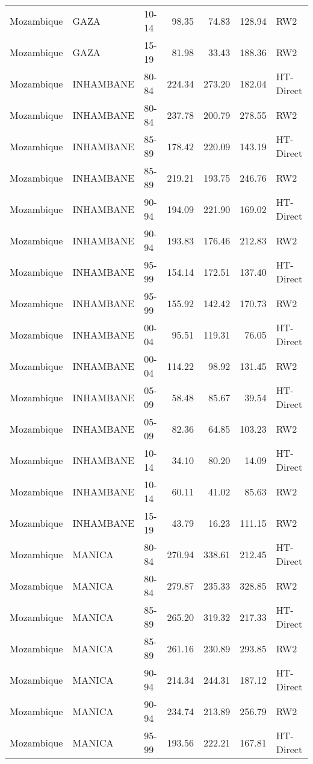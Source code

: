 \begin{longtable}{lllrrrl}
  Mozambique & GAZA & 10-14 & 98.35 & 74.83 & 128.94 & RW2 \\ 
  Mozambique & GAZA & 15-19 & 81.98 & 33.43 & 188.36 & RW2 \\ 
  Mozambique & INHAMBANE & 80-84 & 224.34 & 273.20 & 182.04 & HT-Direct \\ 
  Mozambique & INHAMBANE & 80-84 & 237.78 & 200.79 & 278.55 & RW2 \\ 
  Mozambique & INHAMBANE & 85-89 & 178.42 & 220.09 & 143.19 & HT-Direct \\ 
  Mozambique & INHAMBANE & 85-89 & 219.21 & 193.75 & 246.76 & RW2 \\ 
  Mozambique & INHAMBANE & 90-94 & 194.09 & 221.90 & 169.02 & HT-Direct \\ 
  Mozambique & INHAMBANE & 90-94 & 193.83 & 176.46 & 212.83 & RW2 \\ 
  Mozambique & INHAMBANE & 95-99 & 154.14 & 172.51 & 137.40 & HT-Direct \\ 
  Mozambique & INHAMBANE & 95-99 & 155.92 & 142.42 & 170.73 & RW2 \\ 
  Mozambique & INHAMBANE & 00-04 & 95.51 & 119.31 & 76.05 & HT-Direct \\ 
  Mozambique & INHAMBANE & 00-04 & 114.22 & 98.92 & 131.45 & RW2 \\ 
  Mozambique & INHAMBANE & 05-09 & 58.48 & 85.67 & 39.54 & HT-Direct \\ 
  Mozambique & INHAMBANE & 05-09 & 82.36 & 64.85 & 103.23 & RW2 \\ 
  Mozambique & INHAMBANE & 10-14 & 34.10 & 80.20 & 14.09 & HT-Direct \\ 
  Mozambique & INHAMBANE & 10-14 & 60.11 & 41.02 & 85.63 & RW2 \\ 
  Mozambique & INHAMBANE & 15-19 & 43.79 & 16.23 & 111.15 & RW2 \\ 
  Mozambique & MANICA & 80-84 & 270.94 & 338.61 & 212.45 & HT-Direct \\ 
  Mozambique & MANICA & 80-84 & 279.87 & 235.33 & 328.85 & RW2 \\ 
  Mozambique & MANICA & 85-89 & 265.20 & 319.32 & 217.33 & HT-Direct \\ 
  Mozambique & MANICA & 85-89 & 261.16 & 230.89 & 293.85 & RW2 \\ 
  Mozambique & MANICA & 90-94 & 214.34 & 244.31 & 187.12 & HT-Direct \\ 
  Mozambique & MANICA & 90-94 & 234.74 & 213.89 & 256.79 & RW2 \\ 
  Mozambique & MANICA & 95-99 & 193.56 & 222.21 & 167.81 & HT-Direct \\ 

\end{longtable}
